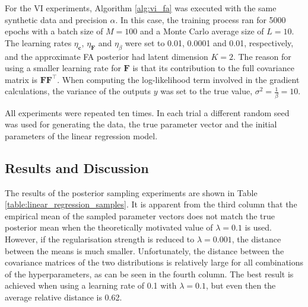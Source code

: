 \documentclass[msc,deptreport.inf]{infthesis} %
\newcommand{\matr}[1]{\mathbf{#1}}
\begin{document}
For the VI experiments, Algorithm \ref{alg:vi_fa} was executed with the same synthetic data and precision $\alpha$. In this case, the training process ran for 5000 epochs with a batch size of $M=100$ and a Monte Carlo average size of $L=10$.  The learning rates $\eta_\matr{c}$,  $\eta_\matr{F}$ and $\eta_\beta$ were set to 0.01, 0.0001 and 0.01, respectively, and the approximate FA posterior had latent dimension $K=2$. The reason for using a smaller learning rate for $\matr{F}$ is that its contribution to the full covariance matrix is $\matr{F}\matr{F}^\intercal$. When computing the log-likelihood term involved in the gradient calculations, the variance of the outputs $y$ was set to the true value, $\sigma^2 = \frac{1}{\beta} = 10$.

All experiments were repeated ten times. In each trial a different random seed was used for generating the data, the true parameter vector and the initial parameters of the linear regression model. 

\subsection{Results and Discussion}

The results of the posterior sampling experiments are shown in Table \ref{table:linear_regression_samples}. It is apparent from the third column that the empirical mean of the sampled parameter vectors does not match the true posterior mean when the theoretically motivated value of $\lambda = 0.1$ is used. However, if the regularisation strength is reduced to $\lambda = 0.001$, the distance between the means is much smaller. Unfortunately, the distance between the covariance matrices of the two distributions is relatively large for all combinations of the hyperparameters, as can be seen in the fourth column. The best result is achieved when using a learning rate of 0.1 with $\lambda = 0.1$, but even then the average relative distance is 0.62. 
\end{document}
